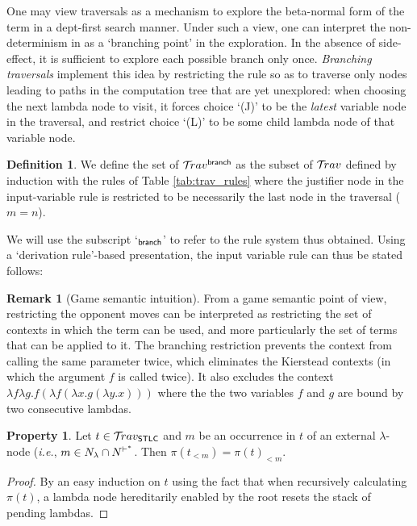 \documentclass{article}
\makeatletter
\theoremstyle{definition}
\newtheorem{definition}{Definition}[section]
\newtheorem{property}{Property}[section]
\newtheorem{remark}{Remark}[section]
\newcommand\Nodes{N}%
\newcommand\NodesVar{N_{\sf var}}%
\newcommand\NodesLmd{N_\lambda}%
\newcommand{\branching}{{\sf branch}}
\newcommand{\travsetbr}{{\travset^\branching}}
\newcommand{\travulc}{\travset}
\newcommand{\travstlc}{{\travset_{\sf STLC}}}
\newcommand{\rulefont}[1]{\mathbf{\sf #1}}
\def\coresymbol{\pi} %
\newcommand{\core}[1]{\coresymbol(#1)} %
\newcommand{\enables}{\vdash} %
\newcommand{\NodeHjByRoot}{\Nodes^{\enables^*}} %
\renewcommand\ie{{\it i.e.\@\xspace}}
\makeatother
\begin{document}
One may view traversals as a mechanism to explore the beta-normal form of the term in a dept-first search manner. Under such a view, one can interpret the non-determinism in  as a `branching point' in the exploration. In the absence of side-effect, it is sufficient to explore each possible branch only once. \emph{Branching traversals} implement this idea by restricting the rule  so as to traverse only nodes leading to paths in the computation tree that are yet unexplored: when choosing the next lambda node to visit, it forces choice `(J)' to be the \emph{latest} variable node in the traversal, and restrict choice `(L)' to be some child lambda node of that variable node.

\begin{definition}
\label{dfn:branching_traversals}
We define the set of  $\travsetbr$ as the subset of $\travulc$ defined by induction with the rules of Table \ref{tab:trav_rules} where the justifier node in the
input-variable rule  is restricted to be necessarily the last node in the traversal ($m=n$).

We will use the subscript `${}_\branching$' to refer to the rule system thus obtained. Using a `derivation rule'-based presentation, the input variable rule can thus be stated follows:
\infrule[$\rulefont{IVar}_\branching$]
     {t \cdot n \in \travsetbr
      \andalso n \in\NodeHjByRoot \inter \NodesVar
      \andalso n \enables_i \alpha
      \andalso i \geq 1
     }
     { \in \travsetbr}
\end{definition}

\begin{remark}[Game semantic intuition]
From a game semantic point of view, restricting the opponent moves can be interpreted as restricting the set of contexts in which the term can be used, and more particularly the set of terms that can be applied to it.
The branching restriction prevents the context from calling the same parameter twice, which eliminates the Kierstead contexts (in which the argument $f$ is called twice). It also excludes the context $\lambda f \lambda g . f (\lambda f (\lambda x . g (\lambda y . x)))$ where the the two variables $f$ and $g$ are bound by two consecutive lambdas.
\end{remark}

\begin{property}
\label{prop:core_truncation_at_externallambda}
Let $t\in\travstlc$ and $m$ be an occurrence in $t$ of an external $\lambda$-node (\ie, $m \in \NodesLmd\inter\NodeHjByRoot$. Then $\core{t_{<m}} = \core{t}_{<m}$.
\end{property}
\begin{proof}
By an easy induction on $t$ using the fact that when recursively calculating $\coresymbol(t)$, a lambda node hereditarily enabled by the root resets the stack of pending lambdas.
\end{proof}
\end{document}

